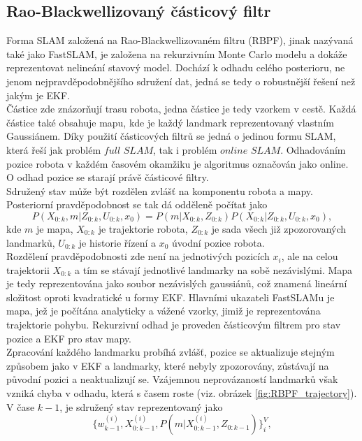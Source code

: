 \documentclass[12pt]{report}
\begin{document}
\subsection{Rao-Blackwellizovaný částicový filtr}
Forma SLAM založená na Rao-Blackwellizovaném filtru (RBPF), jinak nazývaná také jako FastSLAM, je založena na rekurzivním Monte Carlo modelu a dokáže reprezentovat nelineání stavový model. Dochází k odhadu celého posterioru, ne jenom nejpravděpodobnějšího sdružení dat, jedná se tedy o robustnější řešení než jakým je EKF. \\
\indent Částice zde znázorňují trasu robota, jedna částice je tedy vzorkem v cestě. Každá částice také obsahuje mapu, kde je každý landmark reprezentovaný vlastním Gaussiánem. Díky použití částicových filtrů se jedná o jedinou formu SLAM, která řeší jak problém $full$ $SLAM$, tak i problém $online$ $SLAM$. Odhadováním pozice robota v každém časovém okamžiku je algoritmus označován jako online. O odhad pozice se starají právě částicové filtry.\\
\indent Sdružený stav může být rozdělen zvlášť na komponentu robota a mapy. Posteriorní pravděpodobnost se tak dá odděleně počítat jako
\begin{equation}
	P(X_{0:k},m|Z_{0:k},U_{0:k},x_0)=P(m|X_{0:k},Z_{0:k})P(X_{0:k}|Z_{0:k},U_{0:k},x_0),
\end{equation}
kde $m$ je mapa, $X_{0:k}$ je trajektorie robota, $Z_{0:k}$ je sada všech již zpozorovaných landmarků, $U_{0:k}$ je historie řízení a $x_0$ úvodní pozice robota.\\
\indent Rozdělení pravděpodobnosti zde není na jednotivých pozicích $x_i$, ale na celou trajektorii $X_{0:k}$ a tím se stávají jednotlivé landmarky na sobě nezávislými. Mapa je tedy reprezentována jako soubor nezávislých gaussiánů, což znamená lineární složitost oproti kvadratické u formy EKF. Hlavními ukazateli FastSLAMu je mapa, jež je počítána analyticky a vážené vzorky, jimiž je reprezentována trajektorie pohybu. Rekurzivní odhad je proveden částicovým filtrem pro stav pozice a EKF pro stav mapy.\\
\indent Zpracování každého landmarku probíhá zvlášť, pozice se aktualizuje stejným způsobem jako v EKF a landmarky, které nebyly zpozorovány, zůstávají na původní pozici a neaktualizují se. Vzájemnou neprovázaností landmarků však vzniká chyba v odhadu, která s časem roste (viz. obrázek \ref{fig:RBPF_trajectory}).\\
\indent V čase $k-1$, je sdružený stav reprezentovaný jako 
\begin{equation}
	\{w^{(i)}_{k-1},X^{(i)}_{0:k-1},P(m|X^{(i)}_{0:k-1},Z_{0:k-1})\}^V_i,
\end{equation}
\end{document}
